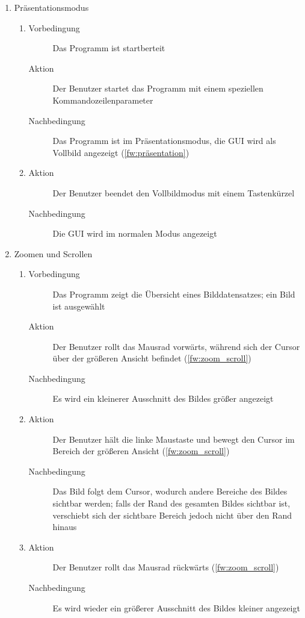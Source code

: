\begin{enumerate} [label=\bfseries /TSW \arabic*0/, leftmargin=*]
	\item Präsentationsmodus \label{ts:präsentation}
	\begin{enumerate}[leftmargin=0pt]
		\item
		\begin{description}
			\item[Vorbedingung] Das Programm ist startberteit
			\item[Aktion] Der Benutzer startet das Programm mit einem speziellen Kommandozeilenparameter
			\item[Nachbedingung] Das Programm ist im Präsentationsmodus, die \gls{GUI} wird als Vollbild angezeigt (\ref{fw:präsentation})
		\end{description}
		\item
		\begin{description}
			\item[Aktion] Der Benutzer beendet den Vollbildmodus mit einem Tastenkürzel
			\item[Nachbedingung] Die \gls{GUI} wird im normalen Modus angezeigt
		\end{description}
	\end{enumerate}

	\item Zoomen und Scrollen \label{ts:zoom_scroll}
	\begin{enumerate}[leftmargin=0pt]
		\item
		\begin{description}
			\item[Vorbedingung] Das Programm zeigt die Übersicht eines Bilddatensatzes; ein Bild ist ausgewählt
			\item[Aktion] Der Benutzer rollt das Mausrad vorwärts, während sich der Cursor über der größeren Ansicht befindet (\ref{fw:zoom_scroll})
			\item[Nachbedingung] Es wird ein kleinerer Ausschnitt des Bildes größer angezeigt
		\end{description}
		\item
		\begin{description}
			\item[Aktion] Der Benutzer hält die linke Maustaste und bewegt den Cursor im Bereich der größeren Ansicht (\ref{fw:zoom_scroll})
			\item[Nachbedingung] Das Bild folgt dem Cursor, wodurch andere Bereiche des Bildes sichtbar werden; falls der Rand des gesamten Bildes sichtbar ist, verschiebt sich der sichtbare Bereich jedoch nicht über den Rand hinaus
		\end{description}
		\item
		\begin{description}
			\item[Aktion] Der Benutzer rollt das Mausrad rückwärts (\ref{fw:zoom_scroll})
			\item[Nachbedingung] Es wird wieder ein größerer Ausschnitt des Bildes kleiner angezeigt
		\end{description}
	\end{enumerate}


\end{enumerate}
